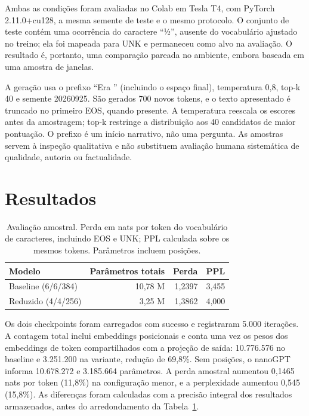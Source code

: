 \documentclass[conference]{IEEEtran}
\begin{document}
Ambas as condições foram avaliadas no Colab em Tesla T4, com PyTorch 2.11.0+cu128, a mesma semente de teste e o mesmo protocolo. O conjunto de teste contém uma ocorrência do caractere ``½'', ausente do vocabulário ajustado no treino; ela foi mapeada para UNK e permaneceu como alvo na avaliação. O resultado é, portanto, uma comparação pareada no ambiente, embora baseada em uma amostra de janelas.

A geração usa o prefixo ``Era '' (incluindo o espaço final), temperatura 0,8, top-k 40 e semente 20260925. São gerados 700 novos tokens, e o texto apresentado é truncado no primeiro EOS, quando presente. A temperatura reescala os escores antes da amostragem; top-k restringe a distribuição aos 40 candidatos de maior pontuação. O prefixo é um início narrativo, não uma pergunta. As amostras servem à inspeção qualitativa e não substituem avaliação humana sistemática de qualidade, autoria ou factualidade.

\section{Resultados}

\begin{table}[t]
\caption{Avaliação amostral. Perda em nats por token do vocabulário de caracteres, incluindo EOS e UNK; PPL calculada sobre os mesmos tokens. Parâmetros incluem posições.}
\label{tab:comparison}
\centering
\begin{tabular}{lrrr}
\toprule
Modelo & Parâmetros totais & Perda & PPL \\
\midrule
Baseline (6/6/384) & 10,78 M & 1,2397 & 3,455 \\
Reduzido (4/4/256) & 3,25 M & 1,3862 & 4,000 \\
\bottomrule
\end{tabular}
\end{table}

Os dois checkpoints foram carregados com sucesso e registraram 5.000 iterações. A contagem total inclui embeddings posicionais e conta uma vez os pesos dos embeddings de token compartilhados com a projeção de saída: 10.776.576 no baseline e 3.251.200 na variante, redução de 69,8\%. Sem posições, o nanoGPT informa 10.678.272 e 3.185.664 parâmetros. A perda amostral aumentou 0,1465 nats por token (11,8\%) na configuração menor, e a perplexidade aumentou 0,545 (15,8\%). As diferenças foram calculadas com a precisão integral dos resultados armazenados, antes do arredondamento da Tabela~\ref{tab:comparison}.
\end{document}

